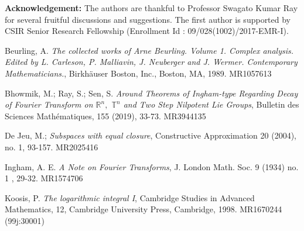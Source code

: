 \documentclass [11pt]{amsart}
\newcommand{\R}{\mathbb R}
\newcommand{\T}{\mathbb T}
\numberwithin{equation}{section}
\begin{document}
\textbf{Acknowledgement:} The authors are thankful to Professor Swagato Kumar Ray for several fruitful discussions and suggestions. The first author is supported by CSIR Senior Research Fellowship (Enrollment Id : 09/028(1002)/2017-EMR-I).


\begin{thebibliography}{99}

	
	 Beurling, A. \textit{The collected works of Arne Beurling. Volume 1. Complex analysis. Edited by L. Carleson, P. Malliavin, J. Neuberger and J. Wermer. Contemporary Mathematicians.}, Birkh\"auser Boston, Inc., Boston, MA,  1989. MR1057613
		 
		 
	 Bhowmik, M.; Ray, S.; Sen, S. \textit{Around Theorems of Ingham-type Regarding Decay of Fourier Transform on $\R^n,$ $\T^n$ and Two Step Nilpotent Lie Groups}, Bulletin des Sciences Mathématiques, 155 (2019), 33-73. MR3944135 
		
	
		
	
	
	 De Jeu, M.; \textit{Subspaces with equal closure}, Constructive Approximation 20 (2004), no. 1, 93-157. MR2025416
	
	
	
		
	
	 Ingham, A. E. \textit{A Note on Fourier Transforms}, J. London Math. Soc. 9 (1934) no. 1 , 29-32. MR1574706	
		
	 Koosis, P. \textit{The logarithmic integral I}, Cambridge Studies in Advanced Mathematics, 12, Cambridge University Press, Cambridge, 1998. MR1670244 (99j:30001)
	

\end{thebibliography}
\end{document}
